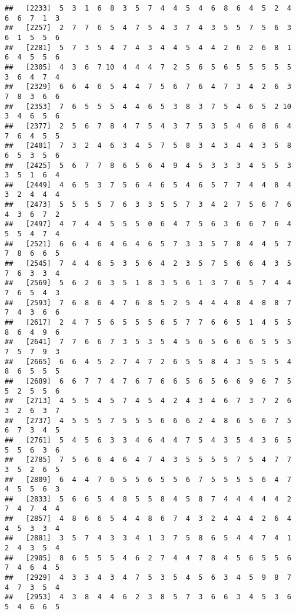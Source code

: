 \documentclass[
]{book}
\begin{document}
\begin{verbatim}
##   [2233]  5  3  1  6  8  3  5  7  4  4  5  4  6  8  6  4  5  2  4  6  6  7  1  3
##   [2257]  2  7  7  6  5  4  7  5  4  3  7  4  3  5  5  7  5  6  3  6  1  5  5  6
##   [2281]  5  7  3  5  4  7  4  3  4  4  5  4  4  2  6  2  6  8  1  6  4  5  5  6
##   [2305]  4  3  6  7 10  4  4  4  7  2  5  6  5  6  5  5  5  5  5  3  6  4  7  4
##   [2329]  6  6  4  6  5  4  4  7  5  6  7  6  4  7  3  4  2  6  3  7  8  3  6  6
##   [2353]  7  6  5  5  5  4  4  6  5  3  8  3  7  5  4  6  5  2 10  3  4  6  5  6
##   [2377]  2  5  6  7  8  4  7  5  4  3  7  5  3  5  4  6  8  6  4  7  6  4  5  5
##   [2401]  7  3  2  4  6  3  4  5  7  5  8  3  4  3  4  4  3  5  8  6  5  3  5  6
##   [2425]  5  6  7  7  8  6  5  6  4  9  4  5  3  3  3  4  5  5  3  3  5  1  6  4
##   [2449]  4  6  5  3  7  5  6  4  6  5  4  6  5  7  7  4  4  8  4  3  2  4  4  4
##   [2473]  5  5  5  5  7  6  3  3  5  5  7  3  4  2  7  5  6  7  6  4  3  6  7  2
##   [2497]  4  7  4  4  5  5  5  0  6  4  7  5  6  3  6  6  7  6  4  5  5  4  7  4
##   [2521]  6  6  4  6  4  6  4  6  5  7  3  3  5  7  8  4  4  5  7  7  8  6  6  5
##   [2545]  7  4  4  6  5  3  5  6  4  2  3  5  7  5  6  6  4  3  5  7  6  3  3  4
##   [2569]  5  6  2  6  3  5  1  8  3  5  6  1  3  7  6  5  7  4  4  7  6  5  4  3
##   [2593]  7  6  8  6  4  7  6  8  5  2  5  4  4  4  8  4  8  8  7  7  4  3  6  6
##   [2617]  2  4  7  5  6  5  5  5  6  5  7  7  6  6  5  1  4  5  5  8  6  4  9  6
##   [2641]  7  7  6  6  7  3  5  3  5  4  5  6  5  6  6  6  5  5  5  7  5  7  9  3
##   [2665]  6  6  4  5  2  7  4  7  2  6  5  5  8  4  3  5  5  5  4  8  6  5  5  5
##   [2689]  6  6  7  7  4  7  6  7  6  6  5  6  5  6  6  9  6  7  5  5  2  5  5  6
##   [2713]  4  5  5  4  5  7  4  5  4  2  4  3  4  6  7  3  7  2  6  3  2  6  3  7
##   [2737]  4  5  5  5  7  5  5  5  6  6  6  2  4  8  6  5  6  7  5  6  7  3  4  5
##   [2761]  5  4  5  6  3  3  4  6  4  4  7  5  4  3  5  4  3  6  5  5  5  6  3  6
##   [2785]  7  5  6  6  4  6  4  7  4  3  5  5  5  5  7  5  4  7  7  3  5  2  6  5
##   [2809]  6  4  4  7  6  5  5  6  5  5  6  7  5  5  5  5  6  4  7  4  5  5  6  3
##   [2833]  5  6  6  5  4  8  5  5  8  4  5  8  7  4  4  4  4  4  2  7  4  7  4  4
##   [2857]  4  8  6  6  5  4  4  8  6  7  4  3  2  4  4  4  2  6  4  4  5  3  3  4
##   [2881]  3  5  7  4  3  3  4  1  3  7  5  8  6  5  4  4  7  4  1  2  4  3  5  4
##   [2905]  8  6  5  5  5  4  6  2  7  4  4  7  8  4  5  6  5  5  6  7  4  6  4  5
##   [2929]  4  3  3  4  3  4  7  5  3  5  4  5  6  3  4  5  9  8  7  4  7  3  5  4
##   [2953]  4  3  8  4  4  6  2  3  8  5  7  3  6  6  3  4  5  3  6  5  4  6  6  5

\end{verbatim}
\end{document}
